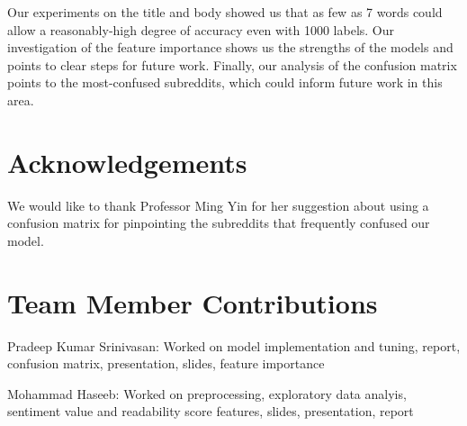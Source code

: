 \documentclass{sig-alternate-05-2015}
\begin{document}
Our experiments on the title and body showed us that as few as 7 words could allow a reasonably-high degree of accuracy even with 1000 labels. Our investigation of the feature importance shows us the strengths of the models and points to clear steps for future work. Finally, our analysis of the confusion matrix points to the most-confused subreddits, which could inform future work in this area.

\section{Acknowledgements}

We would like to thank Professor Ming Yin for her suggestion about using a confusion matrix for pinpointing the subreddits that frequently confused our model.

\section{Team Member Contributions}

Pradeep Kumar Srinivasan: Worked on model implementation and tuning, report, confusion matrix, presentation, slides, feature importance

Mohammad Haseeb: Worked on preprocessing, exploratory data analyis, sentiment value and readability score features, slides, presentation, report


%

%
\end{document}
